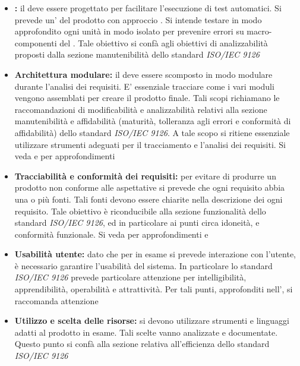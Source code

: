 \documentclass[12pt,a4paper]{article}
\begin{document}
\begin{itemize}
	\item \textbf{:} il  deve essere progettato per facilitare l'esecuzione di test automatici. Si prevede un'  del prodotto con approccio . Si intende testare in modo approfondito ogni unità  in modo isolato per prevenire errori su macro-componenti del . Tale obiettivo si confà agli obiettivi di analizzabilità proposti dalla sezione manutenibilità dello standard \textit{ISO/IEC 9126}
	\item \textbf{Architettura modulare:} il  deve essere scomposto in modo modulare durante l'analisi dei requisiti. E' essenziale tracciare come i vari moduli vengono assemblati per creare il prodotto finale. Tali scopi richiamano le raccomandazioni di modificabilità e analizzabilità relativi alla sezione manutenibilità e affidabilità (maturità, tolleranza agli errori e conformità di affidabilità) dello standard \textit{ISO/IEC 9126}. A tale scopo si ritiene essenziale utilizzare strumenti adeguati per il tracciamento e l'analisi dei requisiti. Si veda \NdP{} e \AdR{} per approfondimenti
	\item \textbf{Tracciabilità e conformità dei requisiti:} per evitare di produrre un prodotto non conforme alle aspettative si prevede che ogni requisito  abbia una o più fonti. Tali fonti devono essere chiarite nella descrizione dei ogni requisito. Tale obiettivo è riconducibile alla sezione funzionalità dello standard \textit{ISO/IEC 9126}, ed in particolare ai punti circa idoneità, e conformità funzionale. Si veda per approfondimenti \NdP{} e \AdR{}
	\item \textbf{Usabilità utente:} dato che per  in esame si prevede interazione con l'utente, è necessario garantire l'usabilità del sistema. In particolare lo standard \textit{ISO/IEC 9126} prevede particolare attenzione per intelligibilità, apprendibilità, operabilità e attrattività. Per tali punti, approfonditi nell'\FAD, si raccomanda attenzione 
	\item \textbf{Utilizzo e scelta delle risorse:} si devono utilizzare strumenti e linguaggi adatti al prodotto in esame. Tali scelte vanno analizzate e documentate. Questo punto si confà alla sezione relativa all'efficienza dello standard \textit{ISO/IEC 9126}
\end{itemize}
\end{document}
